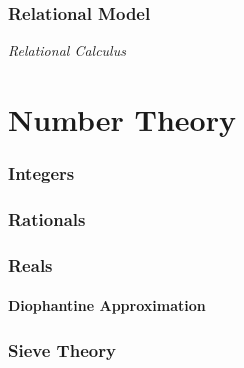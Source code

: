 \documentclass{article}
\begin{document}
\section{Relational Model}\label{sec:relational_model}

\emph{Relational Calculus}

\part{Number Theory}\label{sec:number_theory}

\section{Integers}\label{sec:integer}

\section{Rationals}\label{sec:rational}

\section{Reals}\label{sec:real_number}
\subsection{Diophantine Approximation}\label{subsec:diophantine_approximation}

\section{Sieve Theory}\label{sec:sieve_theory}
\end{document}
